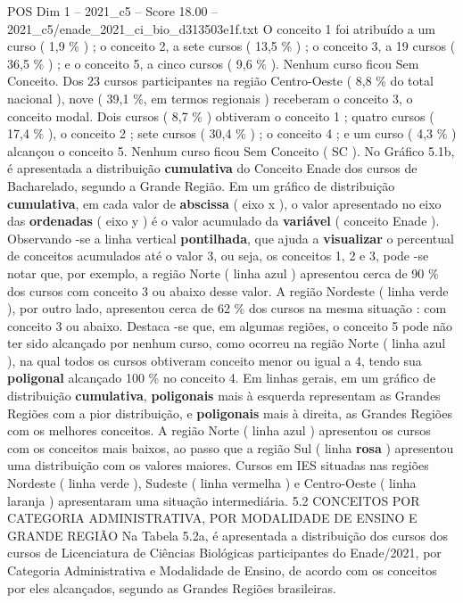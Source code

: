 \begin{textsample}{POS Dim 1 – 2021\_c5 – Score 18.00 – 2021\_c5/enade\_2021\_ci\_bio\_d313503e1f.txt}
O conceito 1 foi atribuído a um curso ( 1,9 \% ) ; o conceito 2, a sete cursos ( 13,5 \% ) ; o conceito 3, a 19 cursos ( 36,5 \% ) ; e o conceito 5, a cinco cursos ( 9,6 \% ).
Nenhum curso ficou Sem Conceito.
Dos 23 cursos participantes na região Centro-Oeste ( 8,8 \% do total nacional ), nove ( 39,1 \%, em termos regionais ) receberam o conceito 3, o conceito modal.
Dois cursos ( 8,7 \% ) obtiveram o conceito 1 ; quatro cursos ( 17,4 \% ), o conceito 2 ; sete cursos ( 30,4 \% ) ; o conceito 4 ; e um curso ( 4,3 \% ) alcançou o conceito 5.
Nenhum curso ficou Sem Conceito ( SC ).
No Gráfico 5.1b, é apresentada a distribuição \textbf{cumulativa} do Conceito Enade dos cursos de Bacharelado, segundo a Grande Região.
Em um gráfico de distribuição \textbf{cumulativa}, em cada valor de \textbf{abscissa} ( eixo x ), o valor apresentado no eixo das \textbf{ordenadas} ( eixo y ) é o valor acumulado da \textbf{variável} ( conceito Enade ).
Observando -se a linha vertical \textbf{pontilhada}, que ajuda a \textbf{visualizar} o percentual de conceitos acumulados até o valor 3, ou seja, os conceitos 1, 2 e 3, pode -se notar que, por exemplo, a região Norte ( linha azul ) apresentou cerca de 90 \% dos cursos com conceito 3 ou abaixo desse valor.
A região Nordeste ( linha verde ), por outro lado, apresentou cerca de 62 \% dos cursos na mesma situação : com conceito 3 ou abaixo.
Destaca -se que, em algumas regiões, o conceito 5 pode não ter sido alcançado por nenhum curso, como ocorreu na região Norte ( linha azul ), na qual todos os cursos obtiveram conceito menor ou igual a 4, tendo sua \textbf{poligonal} alcançado 100 \% no conceito 4.
Em linhas gerais, em um gráfico de distribuição \textbf{cumulativa}, \textbf{poligonais} mais à esquerda representam as Grandes Regiões com a pior distribuição, e \textbf{poligonais} mais à direita, as Grandes Regiões com os melhores conceitos.
A região Norte ( linha azul ) apresentou os cursos com os conceitos mais baixos, ao passo que a região Sul ( linha \textbf{rosa} ) apresentou uma distribuição com os valores maiores.
Cursos em IES situadas nas regiões Nordeste ( linha verde ), Sudeste ( linha vermelha ) e Centro-Oeste ( linha laranja ) apresentaram uma situação intermediária. 5.2 CONCEITOS POR CATEGORIA ADMINISTRATIVA, POR MODALIDADE DE ENSINO E GRANDE REGIÃO Na Tabela 5.2a, é apresentada a distribuição dos cursos dos cursos de Licenciatura de Ciências Biológicas participantes do Enade/2021, por Categoria Administrativa e Modalidade de Ensino, de acordo com os conceitos por eles alcançados, segundo as Grandes Regiões brasileiras.

\end{textsample}
